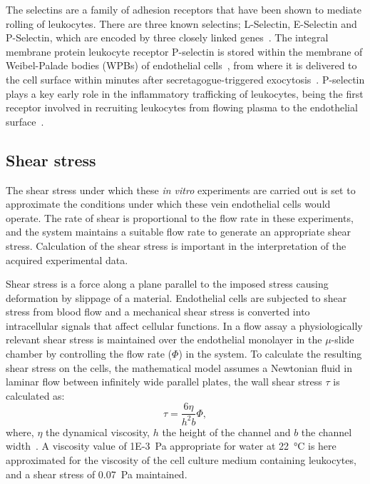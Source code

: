The selectins are a family of adhesion receptors that have been shown to mediate rolling of leukocytes. There are three known selectins; L-Selectin, E-Selectin and P-Selectin, which are encoded by three closely linked genes~\cite{Watson1990}. The integral membrane protein leukocyte receptor P-selectin is stored within the membrane of Weibel-Palade bodies (WPBs) of endothelial cells~\cite{Bonfanti1989, McEver1989}, from where it is delivered to the cell surface within minutes after secretagogue-triggered exocytosis~\cite{McEver2002}. P-selectin plays a key early role in the inflammatory trafficking of leukocytes, being the first receptor involved in recruiting leukocytes from flowing plasma to the endothelial surface~\cite{Larsen1989}.

\subsection{Shear stress}
\label{leukocytes:introduction:shear}
The shear stress under which these \emph{in vitro} experiments are carried out is set to approximate the conditions under which these vein endothelial cells would operate. The rate of shear is proportional to the flow rate in these experiments, and the system maintains a suitable flow rate to generate an appropriate shear stress. Calculation of the shear stress is important in the interpretation of the acquired experimental data.

Shear stress is a force along a plane parallel to the imposed stress causing deformation by slippage of a material. Endothelial cells are subjected to shear stress from blood flow and a mechanical shear stress is converted into intracellular signals that affect cellular functions. In a flow assay a physiologically relevant shear stress is maintained over the endothelial monolayer in the $\mu$-slide chamber by controlling the flow rate ($\Phi$) in the system. To calculate the resulting shear stress on the cells, the mathematical model assumes a Newtonian fluid in laminar flow between infinitely wide parallel plates, the wall shear stress $\tau$ is calculated as:
\begin{equation}
	\tau=\frac{6\eta}{h^2b}\Phi,
\end{equation}
where, $\eta$ the dynamical viscosity, $h$ the height of the channel and $b$ the channel width~\cite{Bacabac2005}. A viscosity value of \SI{1E-3}{Pa} appropriate for water at \SI{22}{\degreeCelsius} is here approximated for the viscosity of the cell culture medium containing leukocytes, and a shear stress of \SI{0.07}{\pascal} maintained.

